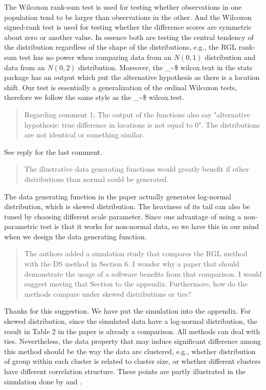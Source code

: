 \documentclass[12pt]{article}
\makeatletter
\newcommand{\pkg}[1]{{\fontseries{b}\selectfont #1}}
\newcommand\code{\bgroup\@makeother\_\@makeother\~\@makeother\$\@codex}
\def\@codex#1{{\normalfont\ttfamily\hyphenchar\font=-1 #1}\egroup}
\newenvironment{comment}%
{\begin{quotation}\noindent\small\it\ignorespaces%
  }{\end{quotation}}
\makeatother
\begin{document}
The Wilcoxon rank-sum test is used for testing whether observations in one
population tend to be larger than observations in the other. And the
Wilcoxon signed-rank test is used for testing whether the difference scores
are symmetric about zero or another value. In essence both are testing the
central tendency of the distribution regardless of the shape of the
distributions, e.g., the RGL rank-sum test has no power when comparing data
from an $N(0, 1)$ distribution and data from an $N(0, 2)$
distribution. Moreover, the \code{wilcox.text} in the \pkg{stats} package
has an output which put the alternative hypothesis as there is a location
shift. Our test is essentially a generalization of the ordinal Wilcoxon
tests, therefore we follow the same style as the \code{wilcox.test}.

\begin{comment}
Regarding comment 1: The output of the functions also say "alternative
hypothesis: true difference in locations is not equal to 0". The distributions are
not identical or something similar.
\end{comment}

See reply for the last comment.

\begin{comment}
The illustrative data generating functions would greatly benefit if other
distributions than normal could be generated.
\end{comment}

The data generating function in the paper actually generates log-normal
distribution, which is skewed distribution. The heaviness of its tail can
also be tuned by choosing different scale parameter. Since one advantage of
using a non-parametric test is that it works for non-normal data, so we have
this in our mind when we design the data generating function.

\begin{comment}
The authors added a simulation study that compares the RGL method with the
DS method in Section 6. I wonder why a paper that should demonstrate the
usage of a software benefits from that comparison. I would suggest moving
that Section to the appendix. Furthermore, how do the methods compare
under skewed distributions or ties?
\end{comment}
Thanks for this suggestion. We have put the simulation into the appendix.
For skewed distribution, since the simulated data have a log-normal
distribution, the result in Table 2 in the paper is already a comparison.
All methods can deal with ties. Nevertheless, the data property that may
induce significant difference among this method should be the way the data
are clustered, e.g., whether distribution of group within each cluster is
related to cluster size, or whether different clusters have different
correlation structure. These points are partly illustrated in the simulation
done by \citet{Datt:Satt:rank:2005} and \citet{Datt:Satt:sign:2008}.
\end{document}
